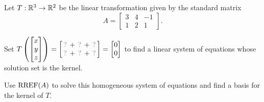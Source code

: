 \begin{activity}{10}
Let $T: \mathbb{R}^3 \rightarrow \mathbb{R}^2$ be the linear transformation given by the
standard matrix
\[A=\begin{bmatrix} 3 & 4 & -1 \\ 1 & 2 & 1 \end{bmatrix}.\]
\begin{subactivity}
Set
\(
  T\left(\begin{bmatrix}x\\y\\z\end{bmatrix}\right)
    =
  \begin{bmatrix}
    \unknown+\unknown+\unknown \\
    \unknown+\unknown+\unknown
  \end{bmatrix}
    =
  \begin{bmatrix}0\\0\end{bmatrix}
\) to find a linear system of equations whose solution set is the kernel.
\end{subactivity}
\begin{subactivity}
Use $\operatorname{RREF}(A)$ to solve this homogeneous system of equations and find a basis
for the kernel of \(T\).
\end{subactivity}
\end{activity}


